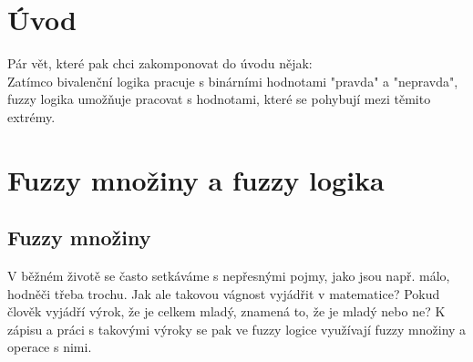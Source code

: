 


\newtheorem{definition}{Definice}
\newtheorem{remark}{Pozn\'amka}
\newtheorem{example}{Příklad}
\newtheorem{graph}{Obr\' azek}
\newtheorem{sentence}{Věta}
\newtheorem{tabul}{Tabulka}

\chapter{Úvod}

\color{blue} Pár vět, které pak chci zakomponovat do \'uvodu nějak:
                \\ 
                \color{black} Zatímco bivalenční logika pracuje s binárními hodnotami "pravda" a "nepravda", fuzzy logika umožňuje pracovat s hodnotami, které se pohybují mezi těmito extrémy.






\chapter {Fuzzy mno\v ziny a fuzzy logika}
\section{Fuzzy mno\v ziny} 


V běžném životě se často setkáváme s nepřesnými pojmy, jako jsou např. \clqq málo\crqq, \clqq hodně\crqq \space či třeba \clqq trochu\crqq \space. Jak ale takovou vágnost vyjádřit v matematice? Pokud člověk vyjádří výrok, že je \clqq celkem mladý\crqq, znamená to, že je mladý nebo ne? K zápisu a práci s takovými výroky se pak ve fuzzy logice využívají fuzzy množiny a operace s nimi.

